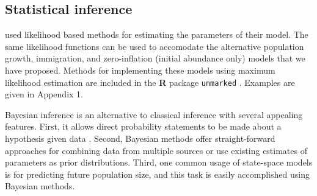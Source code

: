 \documentclass[12pt,english]{article}
\begin{document}
\begin{spacing}{1.9}
\begin{flushleft}




\subsection*{Statistical inference}

\citet{dail_madsen:2011} used likelihood based methods for estimating
the parameters of their model. The same likelihood functions can be
used to accomodate the alternative population growth, immigration, and 
zero-inflation (initial abundance only) models that we
have proposed. Methods for implementing these models using maximum 
likelihood estimation are included in the %
\textbf{R} package \texttt{unmarked} \citep{fiske_chandler:2011}. Examples
are given in Appendix 1.

Bayesian inference is an alternative to classical inference with
several appealing features. First, it allows direct probability
statements to be made about a hypothesis given data
\citep{link_barker:2010}.  Second, Bayesian methods offer
straight-forward approaches for combining data from multiple sources
or use existing estimates of parameters as prior distributions. Third,
one common usage of state-space models is for predicting future
population size, and this task is easily accomplished using Bayesian
methods.


\end{flushleft}
\end{spacing}
\end{document}
